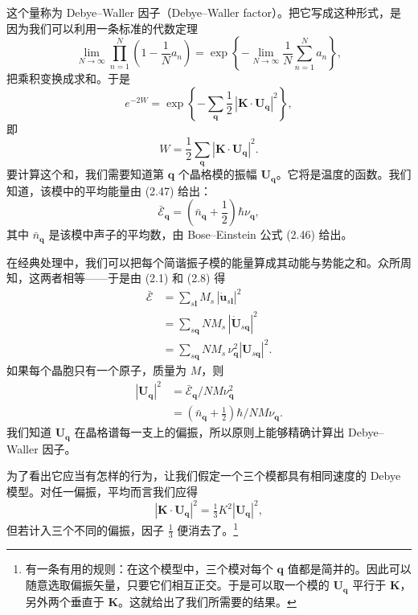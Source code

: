 这个量称为 Debye–Waller 因子（Debye–Waller factor）。把它写成这种形式，是因为我们可以利用一条标准的代数定理
\begin{equation*}
\lim_{N\to\infty}\prod_{n=1}^{N}\left(1-\frac{1}{N}a_{n}\right)=\exp\left\{-\lim_{N\to\infty}\frac{1}{N}\sum_{n=1}^{N}a_{n}\right\},
\tag{2.105}
\end{equation*}
把乘积变换成求和。于是
\begin{equation*}
e^{-2W}=\exp\left\{-\sum_{\mathbf{q}}\frac{1}{2}\,|\mathbf{K}\cdot\mathbf{U}_{\mathbf{q}}|^{2}\right\},
\tag{2.106}
\end{equation*}
即
\begin{equation*}
W=\frac{1}{2}\sum_{\mathbf{q}}|\mathbf{K}\cdot\mathbf{U}_{\mathbf{q}}|^{2}.
\tag{2.107}
\end{equation*}
要计算这个和，我们需要知道第 $\mathbf{q}$ 个晶格模的振幅 $\mathbf{U}_{\mathbf{q}}$。它将是温度的函数。我们知道，该模中的平均能量由 (2.47) 给出：
\begin{equation*}
\bar{\mathcal{E}}_{\mathbf{q}}=\left(\bar{n}_{\mathbf{q}}+\frac{1}{2}\right)\hbar\nu_{\mathbf{q}},
\end{equation*}
其中 $\bar{n}_{\mathbf{q}}$ 是该模中声子的平均数，由 Bose–Einstein 公式 (2.46) 给出。

在经典处理中，我们可以把每个简谐振子模的能量算成其动能与势能之和。众所周知，这两者相等——于是由 (2.1) 和 (2.8) 得
\begin{align*}
\bar{\mathcal{E}}&=\sum_{s\mathbf{l}}M_{s}\,|\dot{\mathbf{u}}_{s\mathbf{l}}|^{2}\\
&=\sum_{s\mathbf{q}}NM_{s}\,|\dot{\mathbf{U}}_{s\mathbf{q}}|^{2}\\
&=\sum_{s\mathbf{q}}NM_{s}\,\nu_{\mathbf{q}}^{2}|\mathbf{U}_{s\mathbf{q}}|^{2}.
\tag{2.108}
\end{align*}
如果每个晶胞只有一个原子，质量为 $M$，则
\begin{align*}
|\mathbf{U}_{\mathbf{q}}|^{2}&=\bar{\mathcal{E}}_{\mathbf{q}}/NM\nu_{\mathbf{q}}^{2}\\
&=(\bar{n}_{\mathbf{q}}+\tfrac{1}{2})\hbar/NM\nu_{\mathbf{q}}.
\tag{2.109}
\end{align*}
我们知道 $\mathbf{U}_{\mathbf{q}}$ 在晶格谱每一支上的偏振，所以原则上能够精确计算出 Debye–Waller 因子。

为了看出它应当有怎样的行为，让我们假定一个三个模都具有相同速度的 Debye 模型。对任一偏振，平均而言我们应得
\begin{equation*}
|\mathbf{K}\cdot\mathbf{U}_{\mathbf{q}}|^{2}=\tfrac{1}{3}K^{2}|\mathbf{U}_{\mathbf{q}}|^{2},
\tag{2.110}
\end{equation*}
但若计入三个不同的偏振，因子 $\frac{1}{3}$ 便消去了。\footnote{有一条有用的规则：在这个模型中，三个模对每个 $\mathbf{q}$ 值都是简并的。因此可以随意选取偏振矢量，只要它们相互正交。于是可以取一个模的 $\mathbf{U}_{\mathbf{q}}$ 平行于 $\mathbf{K}$，另外两个垂直于 $\mathbf{K}$。这就给出了我们所需要的结果。}

